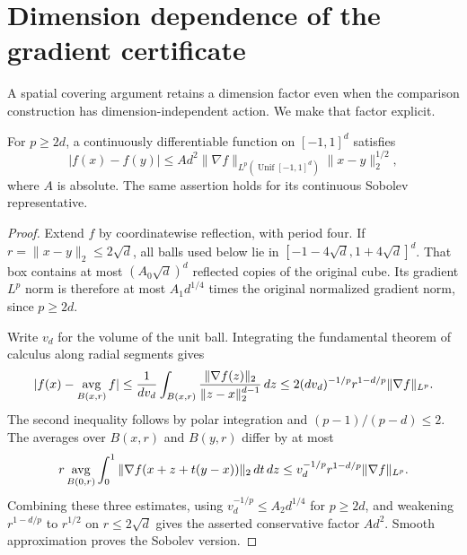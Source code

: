 \section{Dimension dependence of the gradient certificate}
\label{sec:dimension-sobolev}
A spatial covering argument retains a dimension factor even when the
comparison construction has dimension-independent action. We make that
factor explicit.

\begin{lemma}
\label{lem:dimension-morrey}
For $p\ge2d$, a continuously differentiable function on $[-1,1]^d$
satisfies
\[
 |f(x)-f(y)|\le A d^2\|\nabla f\|_{L^p(\operatorname{Unif}[-1,1]^d)}
                   \|x-y\|_2^{1/2},
\]
where $A$ is absolute. The same assertion holds for its continuous
Sobolev representative.
\end{lemma}
\begin{proof}
Extend $f$ by coordinatewise reflection, with period four. If
$r=\|x-y\|_2\le2\sqrt d$, all balls used below lie in
$[-1-4\sqrt d,1+4\sqrt d]^d$. That box contains at most
$(A_0\sqrt d)^d$ reflected copies of the original cube. Its gradient
$L^p$ norm is therefore at most $A_1d^{1/4}$ times the original
normalized gradient norm, since $p\ge2d$.

Write $v_d$ for the volume of the unit ball. Integrating the fundamental
theorem of calculus along radial segments gives
\[
 |f(x)-\mathop{\rm avg}_{B(x,r)}f|
 \le\frac1{dv_d}\int_{B(x,r)}
              \frac{\|\nabla f(z)\|_2}{\|z-x\|_2^{d-1}}\,dz
 \le2(dv_d)^{-1/p}r^{1-d/p}\|\nabla f\|_{L^p}.
\]
The second inequality follows by polar integration and
$(p-1)/(p-d)\le2$. The averages over $B(x,r)$ and $B(y,r)$ differ
by at most
\[
 r\mathop{\rm avg}_{B(0,r)}\int_0^1
       \|\nabla f(x+z+t(y-x))\|_2\,dt\,dz
 \le v_d^{-1/p}r^{1-d/p}\|\nabla f\|_{L^p}.
\]
Combining these three estimates, using
$v_d^{-1/p}\le A_2d^{1/4}$ for $p\ge2d$, and weakening
$r^{1-d/p}$ to $r^{1/2}$ on $r\le2\sqrt d$ gives the asserted
conservative factor $Ad^2$. Smooth approximation proves the Sobolev
version.
\end{proof}

